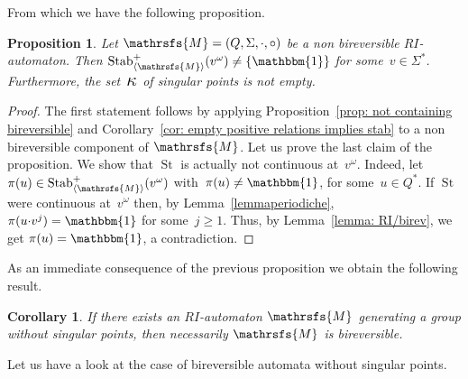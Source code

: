 \documentclass{amsart}
\newtheorem{proposition}[theorem]{Proposition}
\newtheorem{corollary}[theorem]{Corollary}
\begin{document}
From which we have the following proposition.

\begin{proposition}
Let ${{{\mathrsfs{{M}}}}}=({{{Q}}},{{{\Sigma}}},{{{\cdot}}}, {{{\circ}}})$ be a non bireversible $RI$-automaton. Then $\operatorname{Stab}^{+}_{{{\langle}{{\mathrsfs{{{M}}}}}{\rangle}}}(v^{\omega})\neq\{\operatorname{\mathbbm{1}}\}$ for some~$v\in {{{\Sigma}}}^{*}$. Furthermore, the set~${\hbox{\Large{$\kappa$}}}$ of singular points is not empty.
\end{proposition}

\begin{proof}
The first statement follows by applying  Proposition~\ref{prop: not containing bireversible} and Corollary~\ref{cor: empty positive relations implies stab} to a non bireversible component of ${{{\mathrsfs{{M}}}}}$. Let us prove the last claim of the proposition. We show that $\operatorname{St}$ is actually not continuous at~$v^{\omega}$. Indeed, let $\pi(u)\in\operatorname{Stab}^{+}_{{{\langle}{{\mathrsfs{{{M}}}}}{\rangle}}}(v^{\omega})$ with~$\pi(u)\neq \operatorname{\mathbbm{1}}$, for some~$u\in {{{Q}}}^{*}$. If $\operatorname{St}$ were continuous at~$v^{\omega}$ then, by Lemma~\ref{lemmaperiodiche}, $\pi(u{{{\cdot}}} v^{j})=\operatorname{\mathbbm{1}}$ for some~$j\ge 1$. Thus, by Lemma~\ref{lemma: RI/birev}, we get $\pi(u)=\operatorname{\mathbbm{1}}$, a contradiction.
\end{proof}

As an immediate consequence of the previous proposition we obtain the following result.

\begin{corollary}\label{cor: ri-automaton continuous point are bireversible}
If there exists an $RI$-automaton ${{{\mathrsfs{{M}}}}}$ generating a group without singular points, then necessarily ${{{\mathrsfs{{M}}}}}$ is bireversible.
\end{corollary}

Let us have a look at the case of bireversible automata without singular points.
\end{document}
